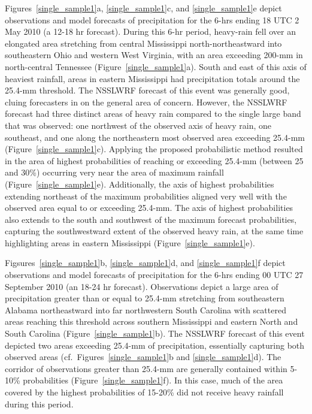 \mbox{Figures \ref{single_sample1}a}, \mbox{\ref{single_sample1}c}, and \mbox{\ref{single_sample1}e} depict observations and model forecasts of precipitation for the 6-hrs ending 18 UTC 2 May 2010 (a 12-18 hr forecast). During this 6-hr period, heavy-rain fell over an elongated area stretching from central Mississippi north-northeastward into southeastern Ohio and western West Virginia, with an area exceeding 200-mm in north-central Tennessee \mbox{(Figure \ref{single_sample1}a)}. South and east of this axis of heaviest rainfall, areas in eastern Mississippi had precipitation totals around the 25.4-mm threshold. The NSSLWRF forecast of this event was generally good, cluing forecasters in on the general area of concern. However, the NSSLWRF forecast had three distinct areas of heavy rain compared to the single large band that was observed: one northwest of the observed axis of heavy rain, one southeast, and one along the northeastern most observed area exceeding 25.4-mm \mbox{(Figure \ref{single_sample1}c)}. Applying the proposed probabilistic method resulted in the area of highest probabilities of reaching or exceeding 25.4-mm (between 25 and 30\%) occurring very near the area of maximum rainfall \mbox{(Figure \ref{single_sample1}e)}. Additionally, the axis of highest probabilities extending northeast of the maximum probabilities aligned very well with the observed area equal to or exceeding 25.4-mm. The axis of highest probabilities also extends to the south and southwest of the maximum forecast probabilities, capturing the southwestward extent of the observed heavy rain, at the same time highlighting areas in eastern Mississippi \mbox{(Figure \ref{single_sample1}e)}.

\mbox{Figsures \ref{single_sample1}b}, \mbox{\ref{single_sample1}d}, and \mbox{\ref{single_sample1}f} depict observations and model forecasts of precipitation for the 6-hrs ending 00 UTC 27 September 2010 (an 18-24 hr forecast). Observations depict a large area of precipitation greater than or equal to 25.4-mm stretching from southeastern Alabama northeastward into far northwestern South Carolina with scattered areas reaching this threshold across southern Mississippi and eastern North and South Carolina \mbox{(Figure \ref{single_sample1}b)}. The NSSLWRF forecast of this event depicted two areas exceeding 25.4-mm of precipitation, essentially capturing both observed areas (\mbox{cf. Figures \ref{single_sample1}b} and \mbox{\ref{single_sample1}d)}. The corridor of observations greater than 25.4-mm are generally contained within 5-10\% probabilities \mbox{(Figure \ref{single_sample1}f)}. In this case, much of the area covered by the highest probabilities of 15-20\% did not receive heavy rainfall during this period.


